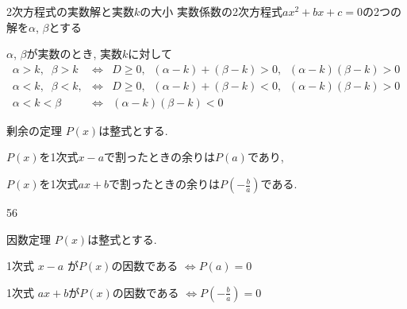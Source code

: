 \documentclass[aspectratio=169, 12pt]{beamer} %
\begin{document}
\begin{frame}{2次方程式の実数解と実数$k$の大小}
    実数係数の2次方程式$ax^2+bx+c=0$の2つの解を$\alpha$, $\beta$とする \par
    $\alpha$, $\beta$が実数のとき, 実数$k$に対して
    \begin{eqnarray*}
        \alpha > k,\;\; \beta > k &\Leftrightarrow& D\geq0, \;\;(\alpha-k)+(\beta-k)>0,\;\;(\alpha-k)(\beta-k) >0\\
        \alpha < k, \;\;\beta < k, &\Leftrightarrow& D\geq0, \;\;(\alpha-k)+(\beta-k)<0, \;\;(\alpha-k)(\beta-k)>0 \\
        \alpha < k < \beta &\Leftrightarrow& (\alpha-k)(\beta-k)<0
    \end{eqnarray*}

\end{frame}
\begin{frame}{剰余の定理}
    $P(x)$は整式とする. \par
    $P(x)$を1次式$x-a$で割ったときの余りは$P(a)$であり, \par
    $P(x)$を1次式$ax+b$で割ったときの余りは$P(-\frac{b}{a})$である.
\end{frame}56
\begin{frame}{因数定理}
    $P(x)$は整式とする. \par
    1次式 $x-a$ が$P(x)$の因数である
    $\Leftrightarrow P(a)=0$ \par
    1次式 $ax+b$が$P(x)$の因数である
    $\Leftrightarrow P(-\frac{b}{a})=0$
\end{frame}
\end{document}
